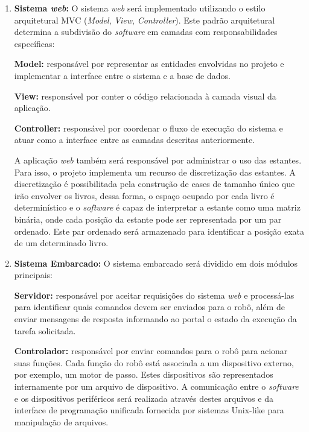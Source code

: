 \begin{enumerate}
    \item\textbf{Sistema \textit{web}:} O sistema \textit{web} será implementado utilizando o estilo arquitetural MVC (\textit{Model}, \textit{View}, \textit{Controller}). Este padrão arquitetural determina a subdivisão do \textit{software} em camadas com responsabilidades específicas:

    \subitem\textbf{Model:} responsável por representar as entidades envolvidas no projeto e implementar a interface entre o sistema e a base de dados.

    \subitem\textbf{View:} responsável por conter o código relacionada à camada visual da aplicação.

    \subitem\textbf{Controller:} responsável por coordenar o fluxo de execução do sistema e atuar como a interface entre as camadas descritas anteriormente.
    
    A aplicação \textit{web} também será responsável por administrar o uso das estantes. Para isso, o projeto implementa um recurso de discretização das estantes. A discretização é possibilitada pela construção de cases de tamanho único que irão envolver os livros, dessa forma, o espaço ocupado por cada livro é determinístico e o \textit{software} é capaz de interpretar a estante como uma matriz binária, onde cada posição da estante pode ser representada por um par ordenado. Este par ordenado será armazenado para identificar a posição exata de um determinado livro.


    \item\textbf{Sistema Embarcado:} O sistema embarcado será dividido em dois módulos principais:

    \subitem\textbf{Servidor:} responsável por aceitar requisições do sistema \textit{web} e processá-las para identificar quais comandos devem ser enviados para o robô, além de enviar mensagens de resposta informando ao portal o estado da execução da tarefa solicitada.

    \subitem\textbf{Controlador: } responsável por enviar comandos para o robô para acionar suas funções. Cada função do robô está associada a um dispositivo externo, por exemplo, um motor de passo. Estes dispositivos são representados internamente por um arquivo de dispositivo. A comunicação entre o \textit{software} e os dispositivos periféricos será realizada através destes arquivos e da interface de programação unificada fornecida por sistemas Unix-like para manipulação de arquivos.
    
\end{enumerate}



